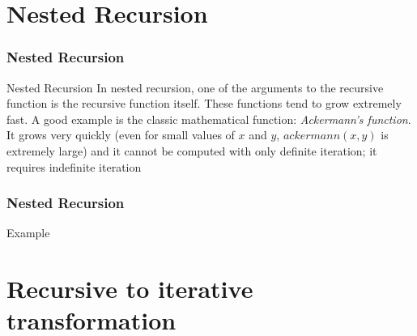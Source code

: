 \documentclass{beamer}
\begin{document}
\section{Nested Recursion}
\begin{frame}
	\frametitle{Nested Recursion}
	\begin{block}{Nested Recursion}
		In nested recursion, one of the arguments to the recursive function is the recursive function itself. These functions tend to grow extremely fast. A good example is the classic mathematical function: \textit{Ackermann's function}. It grows very quickly (even for small values of $x$ and $y$, $ackermann(x,y)$ is extremely large) and it cannot be computed with only definite iteration; it requires indefinite iteration 
			\begin{algorithmic}[1]
					\State{}
				\Else
					\State{}
				\EndIf
				\EndProcedure
			\end{algorithmic}
	\end{block}
\end{frame}
\begin{frame}
	\frametitle{Nested Recursion}
	\begin{block}{Example}
			\begin{algorithmic}[1]
					\State{}
				\Else
						\State{}
					\Else
						\State{}
					\EndIf
				\EndIf
				\EndProcedure
			\end{algorithmic}
	\end{block}
\end{frame}

\section{Recursive to iterative transformation}
\end{document}

